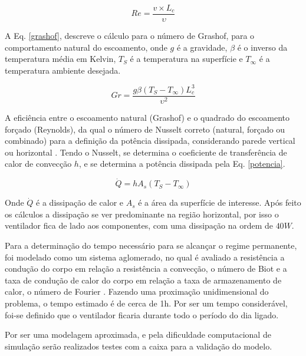 \begin{equation}
	Re= \frac{v \times L_c}{\upsilon}
	\label{reynolds}
\end{equation}

A Eq. \ref{grashof}, descreve o cálculo para o número de Grashof, para o comportamento natural do escoamento, onde $g$ é a gravidade, $\beta$ é o inverso da temperatura média em Kelvin, $T_S$ é a temperatura na superfície e $T_{\infty}$ é a temperatura ambiente desejada.

\begin{equation}
	Gr= \frac{g \beta (T_S-T_{\infty})L_c^3}{\upsilon^2}
	\label{grashof}
\end{equation}

A eficiência entre o escoamento natural (Grashof) e o quadrado do escoamento forçado (Reynolds), da qual o número de Nusselt correto (natural, forçado ou combinado) para a definição da potência dissipada, considerando parede vertical ou horizontal \cite{livro_transcal}. Tendo o Nusselt, se determina o coeficiente de transferência de calor de convecção $h$, e se determina a potência dissipada pela Eq. \ref{potencia}.

\begin{equation}
	\dot{Q}= hA_s(T_S-T_{\infty})
	\label{potencia}
\end{equation}

Onde $\dot{Q}$ é a dissipação de calor e $A_s$ é a área da superfície de interesse. Após feito os cálculos a dissipação se ver predominante na região horizontal, por isso o ventilador fica de lado aos componentes, com uma dissipação na ordem de $40W$.

Para a determinação do tempo necessário para se alcançar o regime permanente, foi modelado como um sistema aglomerado, no qual é avaliado a resistência a condução do corpo em relação a resistência a convecção, o número de Biot e a taxa de condução de calor do corpo em relação a taxa de armazenamento de calor, o número de Fourier \cite{livro_transcal}. Fazendo uma proximação unidimensional do problema, o tempo estimado é de cerca de 1h. Por ser um tempo considerável, foi-se definido que o ventilador ficaria durante todo o período do dia ligado.


Por ser uma modelagem aproximada, e pela dificuldade computacional de simulação serão realizados testes com a caixa para a validação do modelo. 

